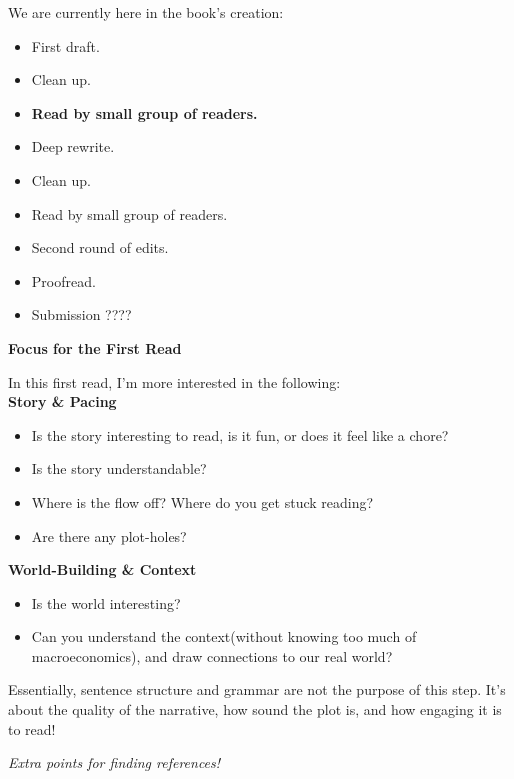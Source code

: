 

We are currently here in the book's creation:\\

\begin{itemize}
 \item First draft.
 \item Clean up.
 \item[\(\rightarrow\)] \textbf{Read by small group of readers.}
 \item Deep rewrite.
 \item Clean up.
 \item Read by small group of readers.
 \item Second round of edits.
 \item Proofread.
 \item Submission ????
\end{itemize}

\vspace{1em}

\textbf{Focus for the First Read}

In this first read, I'm more interested in the following:\\

\textbf{Story \& Pacing}
\begin{itemize}
 \item Is the story interesting to read, is it fun, or does it feel like a chore?
 \item Is the story understandable?
 \item Where is the flow off? Where do you get stuck reading?
 \item Are there any plot-holes?
\end{itemize}

\textbf{World-Building \& Context}
\begin{itemize}
 \item Is the world interesting?
 \item Can you understand the context(without knowing too much of macroeconomics), and draw connections to our real world?
\end{itemize}

\vspace{1em}

Essentially, sentence structure and grammar are not the purpose of this step. It's about the quality of the narrative, how sound the plot is, and how engaging it is to read!

\vspace{0.5em}
\textit{Extra points for finding references!}
